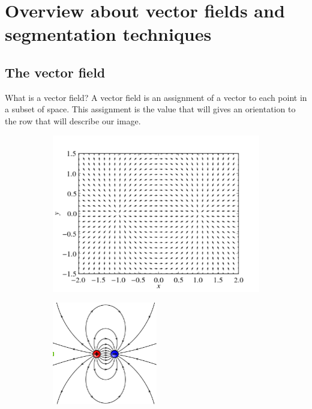 
\chapter{Overview about vector fields and segmentation techniques}
\section{The vector field}
What is a vector field? A vector field is an assignment of a vector to each point in a subset of space. This assignment is the value that will gives an orientation to the row that will describe our image.
\begin{figure}
	\centering
	\begin{subfigure}[b]{0.5\textwidth}
        \includegraphics[width=\textwidth]{img/fieldex.png}
        \caption{ }
        \label{fig:field}
    \end{subfigure}
    \begin{subfigure}[b]{0.5\textwidth}
		\includegraphics[width=\textwidth]{img/dipole.png}

\end{subfigure}
\end{figure}
